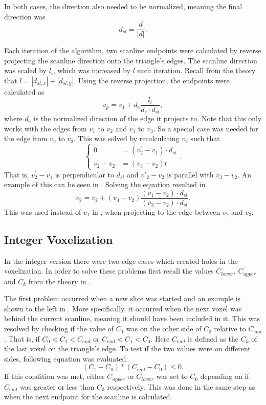 In both cases, the direction also needed to be normalized, meaning the final direction was
$$d_{sl} = \frac{d}{|d|}.$$

Each iteration of the algorithm, two scanline endpoints were calculated by reverse projecting the scanline direction onto the triangle's edges. 
The scanline direction was scaled by $l_i$, which was increased by $l$ each iteration.
Recall from the theory that $l = |d_{sl,x}| + |d_{sl,y}|$.
Using the reverse projection, the endpoints were calculated as
\begin{equation}
v_p = v_1 + d_e\frac{l_i}{d_e \cdot d_{sl}},
\label{eq:inverse-projection}
\end{equation}
where $d_e$ is the normalized direction of the edge it projects to.
Note that this only works with the edges from $v_1$ to $v_2$ and $v_1$ to $v_3$.
So a special case was needed for the edge from $v_2$ to $v_3$.
This was solved by recalculating $v_2$ such that 
\begin{equation*}
  \left\{
    \begin{aligned}
      0 &= (v^\prime_2 - v_1) \cdot d_{sl} \\
      v^\prime_2 - v_2 &= (v_3 - v_2)t 
    \end{aligned}
  \right.
  .
\end{equation*}
That is, $v^\prime_2 - v_1$ is perpendicular to $d_{sl}$ and $v'_2 - v_2$ is parallel with $v_3 - v_2$.
An example of this can be seen in .
Solving the equation resulted in
$$
v^\prime_2 = v_2 + (v_3 - v_2)\frac{(v_1 - v_2) \cdot d_{sl}}{(v_3 - v_2) \cdot d_{sl}}.
$$
This was used instead of $v_1$ in , when projecting to the edge between $v_2$ and $v_3$.


\subsection{Integer Voxelization}\label{ss:meth-integer-vox}
In the integer version there were two edge cases which created holes in the voxelization.
In order to solve these problems first recall the values $C_{lower}$, $C_{upper}$ and $C_k$ from the theory in .

The first problem occurred when a new slice was started and an example is shown to the left in .
More specifically, it occurred when the next voxel was behind the current scanline, meaning it should have been included in it.
This was resolved by checking if the value of $C_1$ was on the other side of $C_0$ relative to $C_{end}$.
That is, if $C_0 < C_1 < C_{end}$ or $C_{end} < C_1 < C_0$.
Here $C_{end}$ is defined as the $C_k$ of the last voxel on the triangle's edge.
To test if the two values were on different sides, following equation was evaluated:
$$ (C_1 - C_0) * (C_{end} - C_0) \leq 0.
$$
If this condition was met, either $C_{upper}$ or $C_{lower}$ was set to $C_0$ depending on if $C_{end}$ was greater or less than $C_0$ respectively.
This was done in the same step as when the next endpoint for the scanline is calculated.


